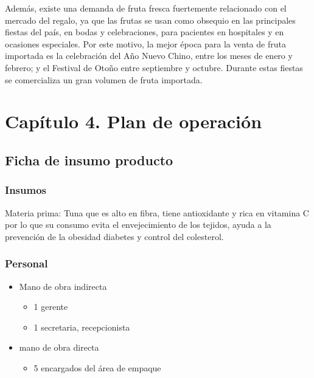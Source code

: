 \documentclass[
  stu,
  floatsintext,
  longtable,
  a4paper,
  nolmodern,
  notxfonts,
  notimes,
  colorlinks=true,linkcolor=blue,citecolor=blue,urlcolor=blue]{apa7}
\providecommand{\tightlist}{%
  \setlength{\itemsep}{0pt}\setlength{\parskip}{0pt}}
\begin{document}
Además, existe una demanda de fruta fresca fuertemente relacionado con
el mercado del regalo, ya que las frutas se usan como obsequio en las
principales fiestas del país, en bodas y celebraciones, para pacientes
en hospitales y en ocasiones especiales. Por este motivo, la mejor época
para la venta de fruta importada es la celebración del Año Nuevo Chino,
entre los meses de enero y febrero; y el Festival de Otoño entre
septiembre y octubre. Durante estas fiestas se comercializa un gran
volumen de fruta importada.

\section{Capítulo 4. Plan de
operación}\label{capuxedtulo-4.-plan-de-operaciuxf3n}

\subsection{Ficha de insumo producto}\label{ficha-de-insumo-producto}

\subsubsection{Insumos}\label{insumos}

Materia prima: Tuna que es alto en fibra, tiene antioxidante y rica en
vitamina C por lo que su consumo evita el envejecimiento de los tejidos,
ayuda a la prevención de la obesidad diabetes y control del colesterol.

\subsubsection{Personal}\label{personal}

\begin{itemize}
\tightlist
\item
  Mano de obra indirecta

  \begin{itemize}
  \tightlist
  \item
    1 gerente
  \item
    1 secretaria, recepcionista
  \end{itemize}
\item
  mano de obra directa

  \begin{itemize}
  \tightlist
  \item
    5 encargados del área de empaque
  \end{itemize}
\end{itemize}
\end{document}
